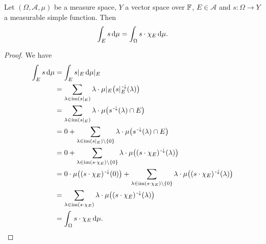 \begin{lemma} \label{simpleIntegralOverSubset}
Let $(\Omega, \mathcal{A}, \mu)$ be a measure space, $Y$ a vector space over $\mathbb{F}$, $E\in\mathcal{A}$ and $s:\Omega\to Y$ a measurable simple function. Then
\[ \int_E s \operatorname{d \!}{\mu} = \int_\Omega s\cdot\chi_{E} \operatorname{d \!}{\mu}. \]
\end{lemma}
\begin{proof}
We have
\begin{align*}
\int_E s \operatorname{d \!}{\mu} &= \int_E s|_E \operatorname{d \!}{\mu|_E}\\
&= \sum_{\lambda \in \operatorname{im}(s|_E)}\lambda\cdot \mu|_E\big(s|_E^{{\text{\hspace{0.15em}-}\downarrow}}(\lambda)\big) \\
&= \sum_{\lambda \in \operatorname{im}(s|_E)}\lambda\cdot \mu\big(s^{{\text{\hspace{0.15em}-}\downarrow}}(\lambda)\cap E\big) \\
&= 0 + \sum_{\lambda \in \operatorname{im}(s|_E)\setminus\{0\}}\lambda\cdot \mu\big(s^{{\text{\hspace{0.15em}-}\downarrow}}(\lambda)\cap E\big) \\
&= 0 + \sum_{\lambda \in \operatorname{im}(s\cdot \chi_E)\setminus\{0\}}\lambda\cdot \mu\big((s\cdot \chi_E)^{{\text{\hspace{0.15em}-}\downarrow}}(\lambda)\big) \\
&= 0\cdot \mu\big((s\cdot \chi_E)^{{\text{\hspace{0.15em}-}\downarrow}}(0)\big) + \sum_{\lambda \in \operatorname{im}(s\cdot \chi_E)\setminus\{0\}}\lambda\cdot \mu\big((s\cdot \chi_E)^{{\text{\hspace{0.15em}-}\downarrow}}(\lambda)\big) \\
&= \sum_{\lambda \in \operatorname{im}(s\cdot \chi_E)}\lambda\cdot \mu\big((s\cdot \chi_E)^{{\text{\hspace{0.15em}-}\downarrow}}(\lambda)\big) \\
&= \int_\Omega s\cdot\chi_E \operatorname{d \!}{\mu}.
\end{align*}
\end{proof}


